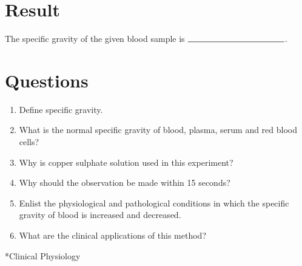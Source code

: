 \documentclass[a4paper,12pt,openany,twoside]{book}
\makeatletter
\renewcommand\part{%
       \if@openright
         \cleardoublepage
       \else
         \clearpage
       \fi
       \thispagestyle{empty}%
       \if@twocolumn
         \onecolumn
         \@tempswatrue
       \else
         \@tempswafalse
       \fi
       \null\vfil
       \secdef\@part\@spart}
\makeatother
\begin{document}
															\section*{Result}
															The specific gravity of the given blood sample is $\rule{4cm}{.5pt}$.
															\section*{Questions}
															\begin{enumerate}
																\item{Define specific gravity.}
																\item{What is the normal specific gravity of blood, plasma, serum and red blood cells?}
																\item{Why is copper sulphate solution used in this experiment?}
																\item{Why should the observation be made within 15 seconds?}
																\item{Enlist the physiological and pathological conditions in which the specific gravity of blood is increased and decreased.}
																\item{What are the clinical applications of this method? }
															\end{enumerate}
															\part*{Clinical Physiology}
															\clearpage
\end{document}
